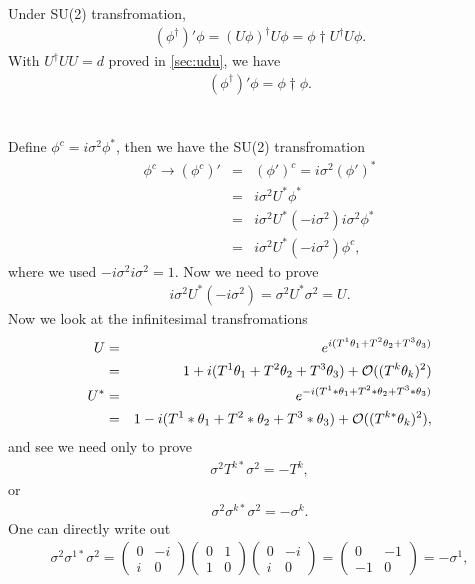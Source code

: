 \documentclass[11pt]{article}
\begin{document}
\section{ }
Under SU(2) transfromation,
\begin{eqnarray}
  (\phi^\dagger)' \phi = (U \phi)^\dagger U \phi= \phi\dagger U^\dagger U \phi.
\end{eqnarray}
With $U^\dagger U U =d$ proved in \ref{sec:udu}, we have
\begin{eqnarray}
  (\phi^\dagger)' \phi = \phi\dagger \phi.
\end{eqnarray}

\section{ } 
Define $\phi^c=i\sigma^2 \phi^*$,
then we have the SU(2) transfromation
\begin{eqnarray}
  \phi^c \to (\phi^c)' &=& (\phi')^c = i\sigma^2 (\phi')^* \nonumber \\
  &=& i\sigma^2 U^* \phi^*\nonumber \\
  &=& i\sigma^2 U^* (-i\sigma^2) i\sigma^2 \phi^*\nonumber \\
  &=&i\sigma^2 U^* (-i\sigma^2) \phi^c,
\end{eqnarray}
where we used $-i\sigma^2 i\sigma^2=1$.
Now we need to prove
\begin{eqnarray}
  i\sigma^2 U^* (-i\sigma^2)= \sigma^2 U^* \sigma^2=U.
\end{eqnarray}
Now we look at the infinitesimal transfromations
\begin{eqnarray}
  U &=& e^{ i(T^1 \theta_1 + T^2 \theta_2 + T^3 \theta_3) }\\
&=& 1 + i(T^1 \theta_1 + T^2 \theta_2 + T^3 \theta_3) + {\cal O}( (T^k \theta_k)^2)\\
U^* &=& e^{ -i (T^1* \theta_1 + T^2* \theta_2 + T^3* \theta_3) }\\
&=& 1 - i(T^1* \theta_1 + T^2* \theta_2 + T^3* \theta_3) + {\cal O}( (T^{k*} \theta_k)^2),
\end{eqnarray}
and see we need only to prove
\begin{eqnarray}
  \sigma^2 T^{k*} \sigma^2=-T^k,
\end{eqnarray}
or
\begin{eqnarray}
  \sigma^2 \sigma^{k*} \sigma^2=-\sigma^k.
\end{eqnarray}
One can directly write out
\begin{eqnarray}
  \sigma^2 \sigma^{1*} \sigma^2=
  \begin{pmatrix}
    0&-i\\i&0
  \end{pmatrix}
  \begin{pmatrix}
    0&1\\1&0
  \end{pmatrix}
  \begin{pmatrix}
    0&-i\\i&0
  \end{pmatrix}
  =  \begin{pmatrix}
    0&-1\\-1&0
  \end{pmatrix}
  =-\sigma^1,
\end{eqnarray}
\end{document}
